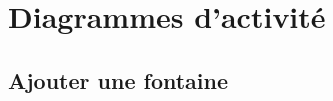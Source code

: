 \documentclass{EPL-master-thesis-covers-FR}
\begin{document}



		

		\label{sec:wireframes}

		

	\chapter{Diagrammes d'activité}

		\label{sec:activity_diag}

		\section*{Ajouter une fontaine}
\end{document}
